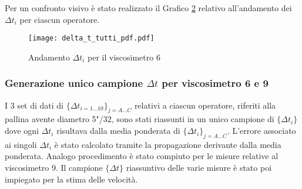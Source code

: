 \documentclass[a4paper,11pt,oneside]{article}
\begin{document}
\begin{figure}[h!]
\small
    \centering
    \label{fig:comp}
\end{figure}


Per un confronto visivo è stato realizzato il Grafico \ref{fig:andamento_delta_t} relativo all'andamento dei $\Delta t_{i}$ per ciascun operatore.

\begin{figure}[h!]
    \centering
    \texttt{[image: delta\_t\_tutti\_pdf.pdf]}
    \caption{Andamento $\Delta t_{i}$ per il viscosimetro 6}
    \label{fig:andamento_delta_t}
\end{figure}

\subsubsection*{Generazione unico campione $\Delta t$ per viscosimetro 6 e 9}
I 3 set di dati di $\{\Delta t_{i=1\dots10}\}_{j=A \dots C}$ relativi a ciascun operatore, riferiti alla pallina avente diametro 5"/32, sono stati riassunti in un unico campione di $\{\Delta t_{i}\}$ dove ogni $\Delta t_{i}$ risultava dalla media ponderata di $\{\Delta t_{i}\}_{j=A \dots C}$. L'errore associato ai singoli ${\Delta t_{i}}$ è stato calcolato tramite la propagazione derivante dalla media ponderata.\newline
Analogo procedimento è stato compiuto per le misure relative al viscosimetro 9.
Il campione $\{\Delta t\}$ riassuntivo delle varie misure è stato poi impiegato per la stima delle velocità.
\end{document}
